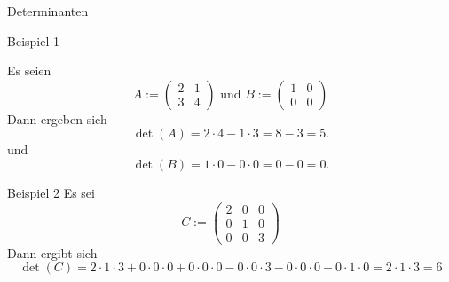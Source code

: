 \documentclass[
  8pt,
  ignorenonframetext,
]{beamer}
\begin{document}
\begin{frame}{Determinanten}
\protect\hypertarget{determinanten-3}{}
\small

Beispiel 1 \footnotesize

Es seien \begin{equation}
A :=
\begin{pmatrix}
2 & 1 \\
3 & 4
\end{pmatrix}
\mbox{ und }
B :=
\begin{pmatrix}
1 & 0 \\
0 & 0
\end{pmatrix}
\end{equation} Dann ergeben sich \begin{equation}
\det(A)
= 2 \cdot 4 - 1 \cdot 3 = 8 - 3 = 5.
\end{equation} und \begin{equation}
\det(B)
= 1 \cdot 0 - 0 \cdot 0 = 0 - 0 = 0.
\end{equation} \vspace{2mm}

\small

Beispiel 2 \footnotesize Es sei \begin{equation}
C :=
\begin{pmatrix}
2 & 0 & 0 \\
0 & 1 & 0 \\
0 & 0 & 3
\end{pmatrix}
\end{equation} Dann ergibt sich \begin{equation}
\det(C)
= 2 \cdot 1 \cdot 3
+ 0 \cdot 0 \cdot 0
+ 0 \cdot 0 \cdot 0
- 0 \cdot 0 \cdot 3
- 0 \cdot 0 \cdot 0
- 0 \cdot 1 \cdot 0
= 2 \cdot 1 \cdot 3
= 6
\end{equation}
\end{frame}
\end{document}
